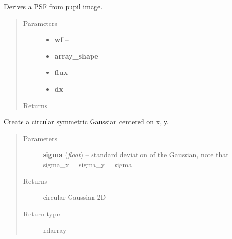 \documentclass[a4paper,11pt,english]{sphinxmanual}
\begin{document}
\begin{fulllineitems}
\label{instrument:sandbox.MTF.PSF}
Derives a PSF from pupil image.
\begin{quote}\begin{description}
\item[{Parameters}] \leavevmode\begin{itemize}
\item {} 
\textbf{wf} -- 

\item {} 
\textbf{array\_shape} -- 

\item {} 
\textbf{flux} -- 

\item {} 
\textbf{dx} -- 

\end{itemize}

\item[{Returns}] \leavevmode


\end{description}\end{quote}

\end{fulllineitems}


\begin{fulllineitems}
\label{instrument:sandbox.MTF.circular2DGaussian}
Create a circular symmetric Gaussian centered on x, y.
\begin{quote}\begin{description}
\item[{Parameters}] \leavevmode
\textbf{sigma} (\emph{float}) -- standard deviation of the Gaussian, note that sigma\_x = sigma\_y = sigma

\item[{Returns}] \leavevmode
circular Gaussian 2D

\item[{Return type}] \leavevmode
ndarray

\end{description}\end{quote}

\end{fulllineitems}
\end{document}
